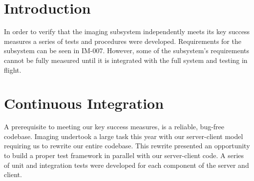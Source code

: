 \documentclass[]{auvsi_doc}
\begin{document}
\begin{AUVSITitlePage}
\begin{artifacttable}
\end{artifacttable}
\end{AUVSITitlePage}

\section{Introduction}

In order to verify that the imaging subsystem independently meets its key success
measures a series of tests and procedures were developed. Requirements for the subsystem
can be seen in IM-007. However, some of the subsystem's requirements cannot be fully
measured until it is integrated with the full system and testing in flight.

\section{Continuous Integration}

A prerequisite to meeting our key success measures, is a reliable, bug-free codebase.
Imaging undertook a large task this year with our server-client model requiring us
to rewrite our entire codebase. This rewrite presented an opportunity to build a 
proper test framework in parallel with our server-client code. A series of unit and
integration tests were developed for each component of the server and client.
\end{document}

